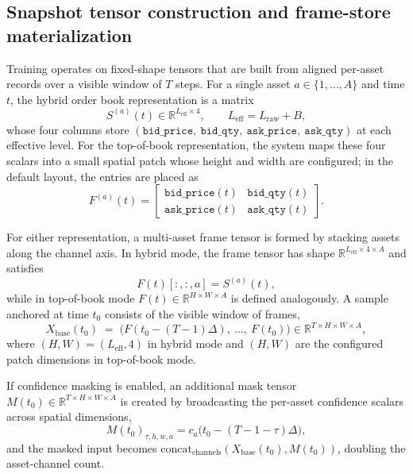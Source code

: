 \documentclass[11pt]{article}
\begin{document}
\subsection{Snapshot tensor construction and frame-store materialization}

Training operates on fixed-shape tensors that are built from aligned per-asset records over a visible window of $T$ steps. For a single asset $a\in\{1,\ldots,A\}$ and time $t$, the hybrid order book representation is a matrix
\begin{equation}
  S^{(a)}(t) \in \mathbb{R}^{L_{\mathrm{eff}}\times 4}, \qquad L_{\mathrm{eff}} = L_{\mathrm{raw}} + B,
\end{equation}
whose four columns store $(\texttt{bid\_price},\ \texttt{bid\_qty},\ \texttt{ask\_price},\ \texttt{ask\_qty})$ at each effective level. For the top-of-book representation, the system maps these four scalars into a small spatial patch whose height and width are configured; in the default layout, the entries are placed as
\begin{equation}
  F^{(a)}(t) = \begin{bmatrix}
    \texttt{bid\_price}(t) & \texttt{bid\_qty}(t) \\
    \texttt{ask\_price}(t) & \texttt{ask\_qty}(t)
  \end{bmatrix}.
\end{equation}

For either representation, a multi-asset frame tensor is formed by stacking assets along the channel axis. In hybrid mode, the frame tensor has shape $\mathbb{R}^{L_{\mathrm{eff}}\times 4\times A}$ and satisfies
\begin{equation}
  F(t)[:,:,a] = S^{(a)}(t),
\end{equation}
while in top-of-book mode $F(t)\in\mathbb{R}^{H\times W\times A}$ is defined analogously. A sample anchored at time $t_0$ consists of the visible window of frames,
\begin{equation}
  X_{\mathrm{base}}(t_0) \;=\; \bigl(F(t_0-(T-1)\Delta),\ \ldots,\ F(t_0)\bigr) \in \mathbb{R}^{T\times H\times W\times A},
\end{equation}
where $(H,W)=(L_{\mathrm{eff}},4)$ in hybrid mode and $(H,W)$ are the configured patch dimensions in top-of-book mode.

If confidence masking is enabled, an additional mask tensor $M(t_0)\in\mathbb{R}^{T\times H\times W\times A}$ is created by broadcasting the per-asset confidence scalars across spatial dimensions,
\begin{equation}
  M(t_0)_{\tau,h,w,a} = c_a\bigl(t_0-(T-1-\tau)\Delta\bigr),
\end{equation}
and the masked input becomes $\mathrm{concat}_{\mathrm{channels}}(X_{\mathrm{base}}(t_0), M(t_0))$, doubling the asset-channel count.
\end{document}
